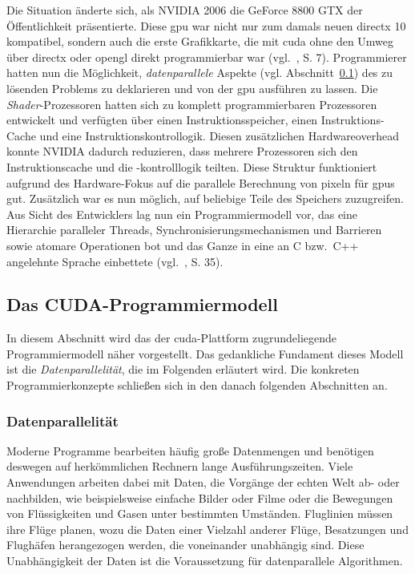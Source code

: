 Die Situation änderte sich, als NVIDIA 2006 die GeForce 8800 GTX der Öffentlichkeit präsentierte. Diese \gls{gpu} war
nicht nur zum damals neuen \gls{directx} 10 kompatibel, sondern auch die erste Grafikkarte, die mit \gls{cuda} ohne den
Umweg über \gls{directx} oder \gls{opengl} direkt programmierbar war (vgl.~\cite{sandkand}, S. 7). Programmierer hatten
nun die Möglichkeit, \textit{datenparallele} Aspekte (vgl. Abschnitt~\ref{cuda:modell}) des zu lösenden Problems zu
deklarieren und von der \gls{gpu} ausführen zu lassen. Die \textit{Shader}-Prozessoren hatten sich zu komplett
programmierbaren Prozessoren entwickelt und verfügten über einen Instruktionsspeicher, einen Instruktions-Cache und eine
Instruktionskontrollogik. Diesen zusätzlichen Hardwareoverhead konnte NVIDIA dadurch reduzieren, dass mehrere
Prozessoren sich den Instruktionscache und die -kontrolllogik teilten. Diese Struktur funktioniert aufgrund des
Hardware-Fokus auf die parallele Berechnung von \gls{pixel}n für \gls{gpu}s gut. Zusätzlich war es nun möglich, auf
beliebige Teile des Speichers zuzugreifen. Aus Sicht des Entwicklers lag nun ein Programmiermodell vor, das eine
Hierarchie paralleler Threads, Synchronisierungsmechanismen und Barrieren sowie atomare Operationen bot und das Ganze in
eine an C bzw.\ C++ angelehnte Sprache einbettete (vgl.~\cite{kirkhwu}, S. 35).

\subsection{Das CUDA-Programmiermodell}\label{cuda:modell}

In diesem Abschnitt wird das der \gls{cuda}-Plattform zugrundeliegende Programmiermodell näher vorgestellt. Das
gedankliche Fundament dieses Modell ist die \textit{Datenparallelität}, die im Folgenden erläutert wird. Die konkreten
Programmierkonzepte schließen sich in den danach folgenden Abschnitten an.

\subsubsection*{Datenparallelität}

Moderne Programme bearbeiten häufig große Datenmengen und benötigen deswegen auf herkömmlichen Rechnern lange
Ausführungszeiten. Viele Anwendungen arbeiten dabei mit Daten, die Vorgänge der echten Welt ab- oder nachbilden, wie
beispielsweise einfache Bilder oder Filme oder die Bewegungen von Flüssigkeiten und Gasen unter bestimmten Umständen.
Fluglinien müssen ihre Flüge planen, wozu die Daten einer Vielzahl anderer Flüge, Besatzungen und Flughäfen herangezogen
werden, die voneinander unabhängig sind. Diese Unabhängigkeit der Daten ist die Voraussetzung für datenparallele
Algorithmen.

